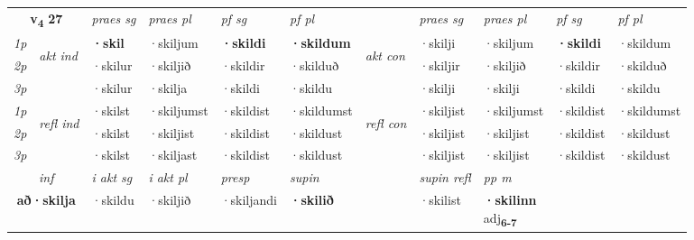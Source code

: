 \noindent
\begin{tabular}{lllllllllll} \toprule
\multicolumn{2}{c}{\textbf{v{\textsubscript{4}}} \Large{\textbf{27}}}  &  \textit{praes sg}  & \textit{praes pl}  &\textit{ pf sg} & \textit{pf pl} &  &  \textit{praes sg}  & \textit{praes pl}  & \textit{pf sg} & \textit{pf pl } \\*
	\cmidrule{3-6} \cmidrule{8-11}
 {\textit{1p}} & \multirow{3}{*}{\begin{turn}{90}\textit{akt ind}\end{turn}} & \textbf{·skil} & ·skiljum & \textbf{·skildi} & \textbf{·skildum} & \multirow{3}{*}{\begin{turn}{90}\textit{akt con}\end{turn}} &·skilji & ·skiljum & \textbf{·skildi} & ·skildum\\*
 {\textit{2p}} &  &  ·skilur  & ·skiljið & ·skildir & ·skilduð & & ·skiljir & ·skiljið & ·skildir & ·skilduð \\*
{\textit{3p}} &  & ·skilur & ·skilja & ·skildi & ·skildu & & ·skilji & ·skilji& ·skildi & ·skildu \\*
\cmidrule{3-6} \cmidrule{8-11}
 {\textit{1p}} & \multirow{3}{*}{\begin{turn}{90}\textit{refl ind}\end{turn}}  & ·skilst & ·skiljumst & ·skildist & ·skildumst & \multirow{3}{*}{\begin{turn}{90}\textit{refl con}\end{turn}}  &·skiljist & ·skiljumst & ·skildist & ·skildumst \\*
 {\textit{2p}} &  & ·skilst & ·skiljist & ·skildist & ·skildust & &·skiljist & ·skiljist & ·skildist & ·skildust \\*
 {\textit{3p}}  & & ·skilst & ·skiljast & ·skildist & ·skildust & & ·skiljist & ·skiljist& ·skildist & ·skildust \\*
\cmidrule{3-6} \cmidrule{8-11}

   \multicolumn{2}{c}{\textit{inf}}  & \textit{i akt sg} & \textit{i akt pl}   & \textit{presp} & \textit{supin} && \textit{supin refl} & \textit{pp m} \\*
  \multicolumn{2}{c}{\textbf{að\allowbreak ·skilja}} & ·skildu  & ·skiljið   & ·skiljandi &  \textbf{·skilið} && ·skilist & \specialcell{\textbf{·skilinn} \\ adj\textbf{\textsubscript{6-7}}} \\*
\end{tabular}

